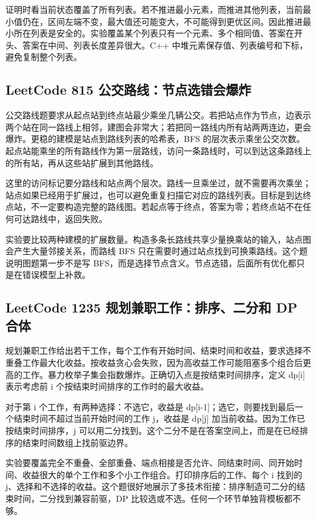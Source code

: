 证明时看当前状态覆盖了所有列表。若不推进最小元素，而推进其他列表，当前最小值仍在，区间左端不变，最大值还可能变大，不可能得到更优区间。因此推进最小所在列表是安全的。实验覆盖某个列表只有一个元素、多个相同值、答案在开头、答案在中间、列表长度差异很大。C++ 中堆元素保存值、列表编号和下标，避免复制整个列表。

\subsection{LeetCode 815 公交路线：节点选错会爆炸}

公交路线题要求从起点站到终点站最少乘坐几辆公交。若把站点作为节点，边表示两个站在同一路线上相邻，建图会非常大；若把同一路线内所有站两两连边，更会爆炸。更稳的建模是站点到路线列表的哈希表，BFS 的层次表示乘坐公交次数。起点站能乘坐的所有路线作为第一层路线，访问一条路线时，可以到达这条路线上的所有站，再从这些站扩展到其他路线。

这里的访问标记要分路线和站点两个层次。路线一旦乘坐过，就不需要再次乘坐；站点如果已经用于扩展过，也可以避免重复扫描它对应的路线列表。目标是到达终点站，不一定要构造完整的路线图。若起点等于终点，答案为零；若终点站不在任何可达路线中，返回失败。

实验要比较两种建模的扩展数量。构造多条长路线共享少量换乘站的输入，站点图会产生大量邻接关系，而路线 BFS 只在需要时通过站点找到可换乘路线。这个题说明图题第一步不是写 BFS，而是选择节点含义。节点选错，后面所有优化都只是在错误模型上补救。

\subsection{LeetCode 1235 规划兼职工作：排序、二分和 DP 合体}

规划兼职工作给出若干工作，每个工作有开始时间、结束时间和收益，要求选择不重叠工作最大化收益。按收益贪心会失败，因为高收益工作可能阻塞多个组合后更高的工作。暴力枚举子集会指数爆炸。正确切入点是按结束时间排序，定义 dp[i] 表示考虑前 i 个按结束时间排序的工作时的最大收益。

对于第 i 个工作，有两种选择：不选它，收益是 dp[i-1]；选它，则要找到最后一个结束时间不超过当前开始时间的工作 j，收益是 dp[j] 加当前收益。因为工作已按结束时间排序，j 可以用二分找到。这个二分不是在答案空间上，而是在已经排序的结束时间数组上找前驱边界。

实验要覆盖完全不重叠、全部重叠、端点相接是否允许、同结束时间、同开始时间、收益很大的单个工作和多个小工作组合。打印排序后的工作、每个 i 找到的 j、选择和不选择的收益。这个题很好地展示了多技术衔接：排序制造可二分的结束时间，二分找到兼容前驱，DP 比较选或不选。任何一个环节单独背模板都不够。

